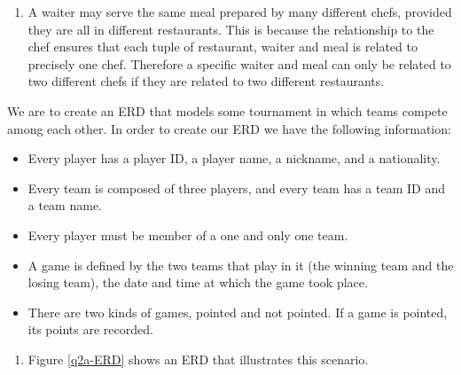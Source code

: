 \documentclass[fleqn]{article}
\begin{document}
\begin{answers}
\begin{enumerate}
\begin{enumerate}
				\item %
					A waiter may serve the same meal prepared by many different chefs, provided they are all in different restaurants. This is because the relationship to the chef ensures that each tuple of restaurant, waiter and meal is related to precisely one chef. Therefore a specific waiter and meal can only be related to two different chefs if they are related to two different restaurants.
			\end{enumerate}
	\end{enumerate}

	\item %
	We are to create an ERD that models some tournament in which teams compete among each other. In order to create our ERD we have the following information:
	\begin{itemize}
		\item
			Every player has a player ID, a player name, a nickname, and a nationality.

		\item
			Every team is composed of three players, and every team has a team ID and a team name.

		\item
			Every player must be member of a one and only one team.

		\item
			A game is defined by the two teams that play in it (the winning team and the losing team), the date and time at which the game took place.

		\item
			There are two kinds of games, pointed and not pointed. If a game is pointed, its points are recorded.
	\end{itemize}

	\begin{enumerate}
		\item %
			Figure \ref{q2a-ERD} shows an ERD that illustrates this scenario.

			\begin{figure}[p]
				\centering
\end{figure}
\end{enumerate}
\end{answers}
\end{document}

